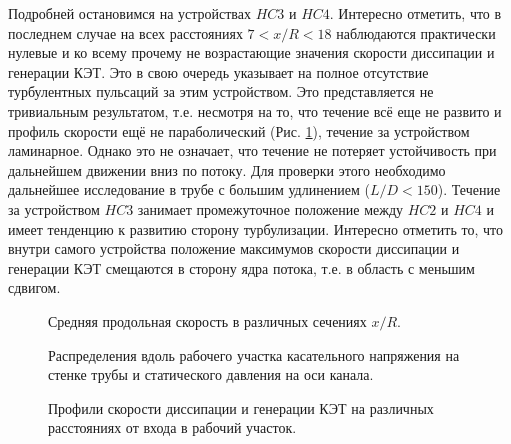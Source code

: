 %
Подробней остановимся на устройствах $HC3$ и $HC4$. 
%
Интересно отметить, что в последнем случае на всех расстояниях $7 < x/R < 18$ 
наблюдаются практически нулевые и ко всему прочему не возрастающие значения скорости диссипации и генерации КЭТ. 
%
Это в свою очередь указывает на полное отсутствие турбулентных пульсаций за этим устройством. 
%
Это представляется не тривиальным результатом, т.е. несмотря на то, что течение всё еще не 
развито и профиль скорости ещё не параболический (Рис. \ref{ch3:fig:vels}), течение за устройством ламинарное. 
%
Однако это не означает, что течение не потеряет устойчивость при дальнейшем движении вниз по потоку. 
%
Для проверки этого необходимо дальнейшее исследование в трубе с большим удлинением ($L/D < 150$). 
%
Течение за устройством $HC3$ занимает промежуточное положение между $HC2$ и $HC4$ 
и имеет тенденцию к развитию сторону турбулизации. 
%
Интересно отметить то, что внутри самого устройства положение максимумов скорости диссипации 
и генерации КЭТ смещаются в сторону ядра потока, т.е. в область с меньшим сдвигом.
%


\begin{figure}[ht]
    \caption{Средняя продольная скорость в различных сечениях $x/R$.}\label{ch3:fig:vels}
\end{figure}

\begin{figure}[ht]
    \caption{Распределения вдоль рабочего участка касательного напряжения на стенке трубы и статического давления на оси канала.}\label{ch3:fig:tau}
\end{figure}

\begin{figure}[ht]
    \caption{Профили скорости диссипации и генерации КЭТ на различных расстояниях от входа в рабочий участок.}\label{ch3:fig:tke}
\end{figure}


